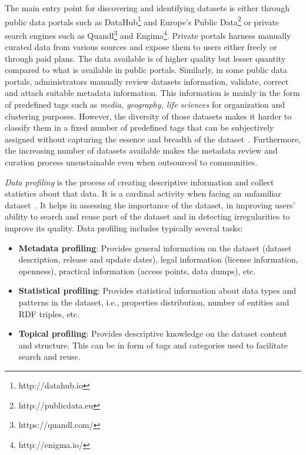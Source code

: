\documentclass[runningheads,a4paper]{llncs}
\begin{document}
The main entry point for discovering and identifying datasets is either through public data portals such as DataHub\footnote{http://datahub.io} and Europe's Public Data\footnote{http://publicdata.eu} or private search engines such as Quandl\footnote{https://quandl.com/} and Engima\footnote{http://enigma.io/}. Private portals harness manually curated data from various sources and expose them to users either freely or through paid plans. The data available is of higher quality but lesser quantity compared to what is available in public portals. Similarly, in some public data portals, administrators manually review datasets information, validate, correct and attach suitable metadata information. This information is mainly in the form of predefined tags such as \textit{media, geography, life sciences} for organization and clustering purposes. However, the diversity of those datasets makes it harder to classify them in a fixed number of predefined tags that can be subjectively assigned without capturing the essence and breadth of the dataset~\cite{6690016}. Furthermore, the increasing number of datasets available makes the metadata review and curation process unsustainable even when outsourced to communities.

\textit{Data profiling} is the process of creating descriptive information and collect statistics about that data. It is a cardinal activity when facing an unfamiliar dataset~\cite{semwebprofiling}. It helps in assessing the importance of the dataset, in improving users' ability to search and reuse part of the dataset and in detecting irregularities to improve its quality. Data profiling includes typically several tasks:
\begin{itemize}
  \item \textbf{Metadata profiling}: Provides general information on the dataset (dataset description, release and update dates), legal information (license information, openness), practical information (access points, data dumps), etc.
  \item \textbf{Statistical profiling}: Provides statistical information about data types and patterns in the dataset, i.e., properties distribution, number of entities and RDF triples, etc.
  \item \textbf{Topical profiling}: Provides descriptive knowledge on the dataset content and structure. This can be in form of tags and categories used to facilitate search and reuse.
\end{itemize}
\end{document}
